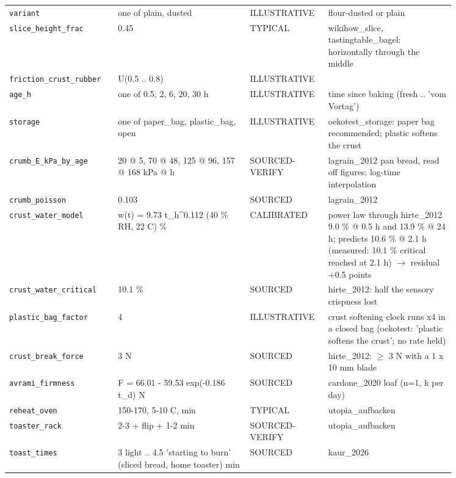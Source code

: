 \documentclass[10.5pt,a4paper]{article}
\begin{document}
{\begin{longtable}{@{}p{0.2\linewidth}p{0.27\linewidth}p{0.12\linewidth}p{0.26\linewidth}@{}}
\texttt{variant} & one of plain, dusted & ILLUSTRATIVE & flour-dusted or plain \\
\texttt{slice\_\allowbreak{}height\_\allowbreak{}frac} & 0.45 & TYPICAL & wikihow\_slice, tastingtable\_bagel: horizontally through the middle \\
\texttt{friction\_\allowbreak{}crust\_\allowbreak{}rubber} & U(0.5 .. 0.8) & ILLUSTRATIVE &  \\
\texttt{age\_\allowbreak{}h} & one of 0.5, 2, 6, 20, 30 h & ILLUSTRATIVE & time since baking (fresh .. 'vom Vortag') \\
\texttt{storage} & one of paper\_bag, plastic\_bag, open & ILLUSTRATIVE & oekotest\_storage: paper bag recommended; plastic softens the crust \\
\texttt{crumb\_\allowbreak{}E\_\allowbreak{}kPa\_\allowbreak{}by\_\allowbreak{}age} & 20 @ 5, 70 @ 48, 125 @ 96, 157 @ 168 kPa @ h & SOURCED-VERIFY & lagrain\_2012 pan bread, read off figures; log-time interpolation \\
\texttt{crumb\_\allowbreak{}poisson} & 0.103 & SOURCED & lagrain\_2012 \\
\texttt{crust\_\allowbreak{}water\_\allowbreak{}model} & w(t) = 9.73 t\_h\^{}0.112 (40 \% RH, 22 C) \% & CALIBRATED & power law through hirte\_2012 9.0 \% @ 0.5 h and 13.9 \% @ 24 h; predicts 10.6 \% @ 2.1 h (measured: 10.1 \% critical reached at 2.1 h) $\to$ residual +0.5 points \\
\texttt{crust\_\allowbreak{}water\_\allowbreak{}critical} & 10.1 \% & SOURCED & hirte\_2012: half the sensory crispness lost \\
\texttt{plastic\_\allowbreak{}bag\_\allowbreak{}factor} & 4 & ILLUSTRATIVE & crust softening clock runs x4 in a closed bag (oekotest: 'plastic softens the crust'; no rate held) \\
\texttt{crust\_\allowbreak{}break\_\allowbreak{}force} & 3 N & SOURCED & hirte\_2012: $\ge$ 3 N with a 1 x 10 mm blade \\
\texttt{avrami\_\allowbreak{}firmness} & F = 66.01 - 59.53 exp(-0.186 t\_d) N & SOURCED & cardone\_2020 loaf (n=1, k per day) \\
\texttt{reheat\_\allowbreak{}oven} & 150-170, 5-10 C, min & TYPICAL & utopia\_aufbacken \\
\texttt{toaster\_\allowbreak{}rack} & 2-3 + flip + 1-2 min & SOURCED-VERIFY & utopia\_aufbacken \\
\texttt{toast\_\allowbreak{}times} & 3 light .. 4.5 'starting to burn' (sliced bread, home toaster) min & SOURCED & kaur\_2026 \\

\end{longtable}}
\end{document}

